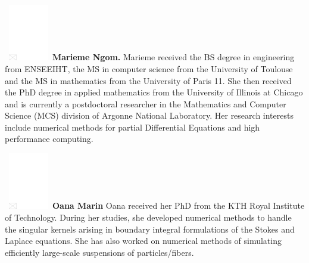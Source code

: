 \documentclass[AMS,STIX1COL]{WileyNJD-v2}
\begin{document}
\begin{biography}{\includegraphics[width=60pt,height=70pt,draft]{empty}}{\textbf{Marieme Ngom.} Marieme received the BS degree in engineering from ENSEEIHT, the MS in computer science from the University of Toulouse and the MS in mathematics from the University of Paris 11. She then received the PhD degree in applied mathematics from the University of Illinois at Chicago and is currently a postdoctoral researcher in the Mathematics and Computer Science (MCS) division of Argonne National Laboratory. Her research interests include numerical methods for partial Differential Equations and high performance computing.}
\end{biography}
\begin{biography}{\includegraphics[width=60pt,height=70pt,draft]{empty}}{\textbf{Oana Marin} Oana received her PhD from the KTH Royal Institute of Technology. During her studies, she developed numerical methods to handle the singular kernels arising in boundary integral formulations of the Stokes and Laplace equations. She has also worked on numerical methods of simulating efficiently large-scale suspensions of particles/fibers.}
\end{biography}
\end{document}
